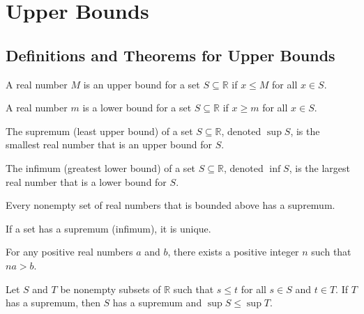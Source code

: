 \section{Upper Bounds}

\subsection*{Definitions and Theorems for Upper Bounds}

\begin{definition}
A real number $M$ is an upper bound for a set $S \subseteq \mathbb{R}$ if $x \leq M$ for all $x \in S$.
\end{definition}

\begin{definition}
A real number $m$ is a lower bound for a set $S \subseteq \mathbb{R}$ if $x \geq m$ for all $x \in S$.
\end{definition}

\begin{definition}[Supremum]
The supremum (least upper bound) of a set $S \subseteq \mathbb{R}$, denoted $\sup S$, is the smallest real number that is an upper bound for $S$.
\end{definition}

\begin{definition}[Infimum]
The infimum (greatest lower bound) of a set $S \subseteq \mathbb{R}$, denoted $\inf S$, is the largest real number that is a lower bound for $S$.
\end{definition}

\begin{theorem}
Every nonempty set of real numbers that is bounded above has a supremum.
\end{theorem}

\begin{theorem}
If a set has a supremum (infimum), it is unique.
\end{theorem}

\begin{theorem}
For any positive real numbers $a$ and $b$, there exists a positive integer $n$ such that $na > b$.
\end{theorem}

\begin{theorem}
Let $S$ and $T$ be nonempty subsets of $\mathbb{R}$ such that $s \leq t$ for all $s \in S$ and $t \in T$. If $T$ has a supremum, then $S$ has a supremum and $\sup S \leq \sup T$.
\end{theorem}


